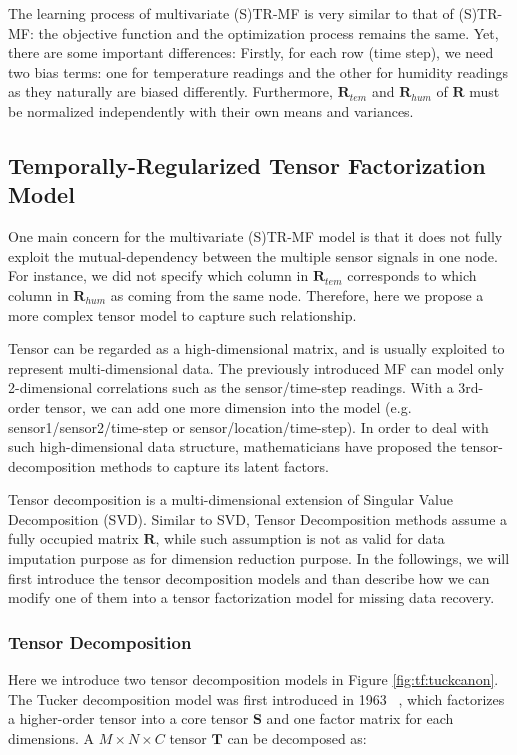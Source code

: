 The learning process of multivariate (S)TR-MF is very similar to that of (S)TR-MF: the objective function and the optimization process remains the same. Yet, there are some important differences: 
Firstly, for each row (time step), we need two bias terms: one for temperature readings and the other for humidity readings as they naturally are biased differently. Furthermore, $\mathbf{R}_{tem}$ and $\mathbf{R}_{hum}$ of $\mathbf{R}$ must be normalized independently with their own means and variances. 

 
\subsection{Temporally-Regularized Tensor Factorization Model} \label{sec:tensordecomp}

One main concern for the multivariate (S)TR-MF model is that it does not fully exploit the mutual-dependency between the multiple sensor signals in one node. For instance, we did not specify which column in $\mathbf{R}_{tem}$ corresponds to which column in $\mathbf{R}_{hum}$ as coming from the same node. Therefore, here we propose a more complex tensor model to capture such relationship. 

Tensor can be regarded as a high-dimensional matrix, and is usually exploited to represent multi-dimensional data. The previously introduced MF can model only 2-dimensional correlations such as the sensor/time-step readings. With a 3rd-order tensor, we can add one more dimension into the model (e.g. sensor1/sensor2/time-step or sensor/location/time-step). In order to deal with such high-dimensional data structure, mathematicians have proposed the tensor-decomposition methods to capture its latent factors. 

Tensor decomposition is a multi-dimensional extension of Singular Value Decomposition (SVD). Similar to SVD, Tensor Decomposition methods assume a fully occupied matrix $\mathbf{R}$, while such assumption is not as valid for data imputation purpose as for dimension reduction purpose.
In the followings, we will first introduce the tensor decomposition models and than describe how we can modify one of them into a tensor factorization model for missing data recovery. 

 
\subsubsection{Tensor Decomposition}
Here we introduce two tensor decomposition models in Figure \ref{fig:tf:tuckcanon}. The Tucker decomposition model was first introduced in 1963 ~\cite{tucker1963TF}, which factorizes a higher-order tensor into a core tensor $\mathbf{S}$ and one factor matrix for each dimensions.
A $M\times N \times C $ tensor $\mathbf{T}$ can be decomposed as:

